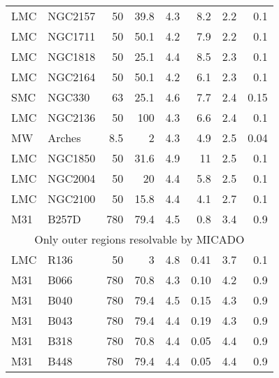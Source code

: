 \documentclass{aa}
\begin{document}
\begin{appendix}
\begin{table*}
\begin{tabular}{l l r r r r r r}
        LMC    & NGC2157      & 50       & 39.8 & 4.3       & 8.2     & 2.2            & 0.1           \\
        LMC    & NGC1711      & 50       & 50.1 & 4.2       & 7.9     & 2.2            & 0.1           \\
        LMC    & NGC1818      & 50       & 25.1 & 4.4       & 8.5     & 2.3            & 0.1           \\
        LMC    & NGC2164      & 50       & 50.1 & 4.2       & 6.1     & 2.3            & 0.1           \\
        SMC    & NGC330       & 63       & 25.1 & 4.6       & 7.7     & 2.4            & 0.15          \\
        LMC    & NGC2136      & 50       & 100  & 4.3       & 6.6     & 2.4            & 0.1           \\
        MW     & Arches       & 8.5      & 2    & 4.3       & 4.9     & 2.5            & 0.04          \\
        LMC    & NGC1850      & 50       & 31.6 & 4.9       & 11      & 2.5            & 0.1           \\
        LMC    & NGC2004      & 50       & 20   & 4.4       & 5.8     & 2.5            & 0.1           \\
        LMC    & NGC2100      & 50       & 15.8 & 4.4       & 4.1     & 2.7            & 0.1           \\
        M31    & B257D        & 780      & 79.4 & 4.5       & 0.8     & 3.4            & 0.9           \\
        \hline
        \multicolumn{8}{c}{Only outer regions resolvable by MICADO}                                    \\
        \hline
        LMC    & R136         & 50       & 3    & 4.8       & 0.41    & 3.7            & 0.1           \\
        M31    & B066         & 780      & 70.8 & 4.3       & 0.10    & 4.2            & 0.9           \\
        M31    & B040         & 780      & 79.4 & 4.5       & 0.15    & 4.3            & 0.9           \\
        M31    & B043         & 780      & 79.4 & 4.4       & 0.19    & 4.3            & 0.9           \\
        M31    & B318         & 780      & 70.8 & 4.4       & 0.05    & 4.4            & 0.9           \\
        M31    & B448         & 780      & 79.4 & 4.4       & 0.05    & 4.4            & 0.9           \\

\end{tabular}
\end{table*}
\end{appendix}
\end{document}
